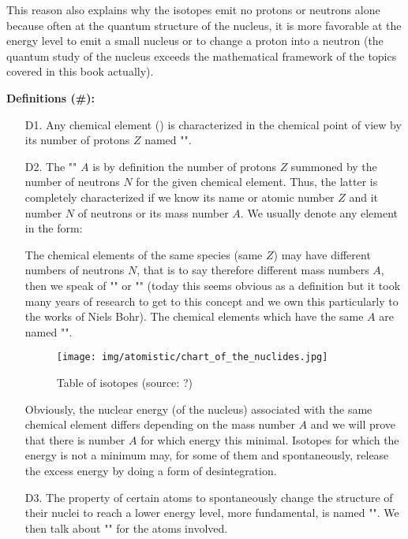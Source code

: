 	This reason also explains why the isotopes emit no protons or neutrons alone because often at the quantum structure of the nucleus, it is more favorable at the energy level to emit a small nucleus or to change a proton into a neutron (the quantum study of the nucleus exceeds the mathematical framework of the topics covered in this book actually).
	
	\textbf{Definitions (\#\mydef):}
	\begin{enumerate}
		\item[D1.] Any chemical element () is characterized in the chemical point of view by its number of protons $Z$ named "".
		
		\item[D2.] The "" $A$ is by definition the number of protons $Z$ summoned by the number of neutrons $N$ for the given chemical element. Thus, the latter is completely characterized if we know its name or atomic number $Z$ and it  number $N$ of neutrons or its mass number $A$. We usually denote any element in the form:
		
		The chemical elements of the same species (same $Z$) may have different numbers of neutrons $N$, that is to say therefore different mass numbers $A$, then we speak of "" or "" (today this seems obvious as a definition but it took many years of research to get to this concept and we own this particularly to the works of Niels Bohr). The chemical elements which have the same $A$ are named "".
		\begin{figure}[H]
		\centering
		\texttt{[image: img/atomistic/chart\_of\_the\_nuclides.jpg]}	
		\caption{Table of isotopes (source: ?)}
	\end{figure}
		Obviously, the nuclear energy (of the nucleus) associated with the same chemical element differs depending on the mass number $A$ and we will prove that there is number $A$ for which energy this minimal. Isotopes for which the energy is not a minimum may, for some of them and spontaneously, release the excess energy by doing a form of desintegration.
		
		\item[D3.] The property of certain atoms to spontaneously change the structure of their nuclei to reach a lower energy level, more fundamental, is named "". We then talk about "" for the atoms involved.
		

\end{enumerate}
